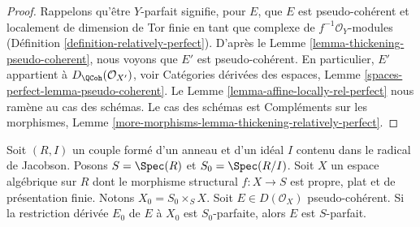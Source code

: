 \begin{proof}
Rappelons qu'être $Y$-parfait signifie, pour $E$, que $E$ est
pseudo-cohérent et localement de dimension de Tor finie en tant que complexe
de $f^{-1}\mathcal{O}_Y$-modules
(Définition \ref{definition-relatively-perfect}).
D'après le Lemme \ref{lemma-thickening-pseudo-coherent},
nous voyons que $E'$ est pseudo-cohérent.
En particulier, $E'$ appartient à $D_\QCoh(\mathcal{O}_{X'})$, voir
Catégories dérivées des espaces, Lemme
\ref{spaces-perfect-lemma-pseudo-coherent}.
Le Lemme \ref{lemma-affine-locally-rel-perfect}
nous ramène au cas des schémas.
Le cas des schémas est
Compléments sur les morphismes, Lemme
\ref{more-morphisms-lemma-thickening-relatively-perfect}.
\end{proof}

\begin{lemma}
\label{lemma-henselian-relatively-perfect}
Soit $(R, I)$ un couple formé d'un anneau et d'un idéal $I$
contenu dans le radical de Jacobson. Posons $S = \Spec(R)$ et $S_0 = \Spec(R/I)$.
Soit $X$ un espace algébrique sur $R$ dont le morphisme structural
$f : X \to S$ est propre, plat et de présentation finie.
Notons $X_0 = S_0 \times_S X$. Soit $E \in D(\mathcal{O}_X)$
pseudo-cohérent. Si la restriction dérivée $E_0$ de $E$
à $X_0$ est $S_0$-parfaite, alors $E$ est $S$-parfait.
\end{lemma}

